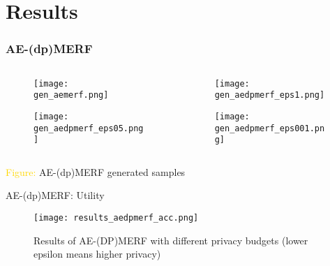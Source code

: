 \section{Results}

\begin{frame}
    \frametitle{AE-(dp)MERF}

    \begin{columns}
        \begin{column}{0.48\textwidth}
        \begin{figure}
            \centering
            \texttt{[image: gen\_aemerf.png]}
        \end{figure}
        \begin{figure}[h]
            \centering
            \texttt{[image: gen\_aedpmerf\_eps05.png]}
        \end{figure}
    \end{column}
    \begin{column}{0.48\textwidth}
        \begin{figure}
            \centering
            \texttt{[image: gen\_aedpmerf\_eps1.png]}
        \end{figure}
        \begin{figure}[h]
            \centering
            \texttt{[image: gen\_aedpmerf\_eps001.png]}
        \end{figure}
    \end{column}
    
    \end{columns}
    \centering
    \textcolor{gold}{Figure:} AE-(dp)MERF generated samples

\end{frame}

\begin{frame}{AE-(dp)MERF: Utility}
    \begin{figure}
        \centering
        \texttt{[image: results\_aedpmerf\_acc.png]}
        \caption{Results of AE-(DP)MERF with different privacy budgets (lower epsilon means higher privacy)}
        \label{fig:enter-label}
    \end{figure}
\end{frame}

